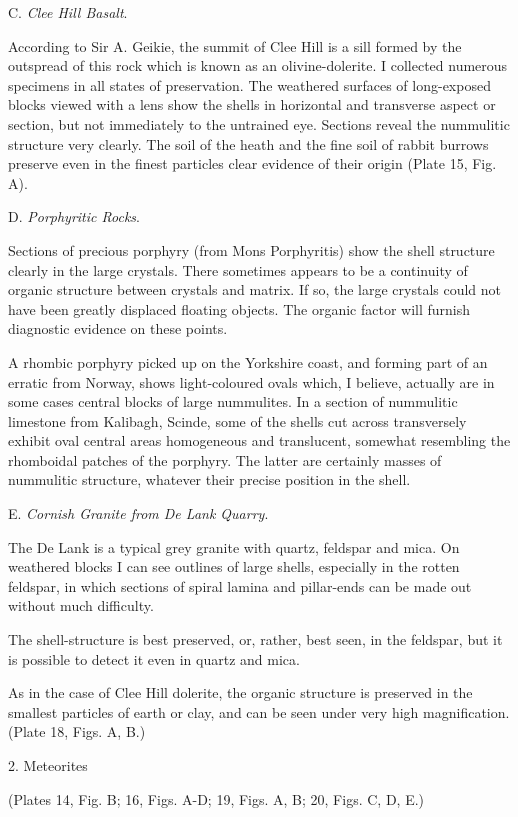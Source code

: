 \documentclass[a4paper, 12pt, oneside]{article}
\begin{document}
C. \emph{Clee Hill Basalt}.

According to Sir A. Geikie, the summit of Clee Hill is a sill formed by the outspread of this rock which is known as an olivine-dolerite. I collected numerous specimens in all states of preservation. The weathered surfaces of long-exposed blocks viewed with a lens show the shells in horizontal and transverse aspect or section, but not immediately to the untrained eye. Sections reveal the nummulitic structure very clearly. The soil of the heath and the fine soil of rabbit burrows preserve even in the finest particles clear evidence of their origin (Plate 15, Fig. A).

D. \emph{Porphyritic Rocks}.

Sections of precious porphyry (from Mons Porphyritis) show the shell structure clearly in the large crystals. There sometimes appears to be a continuity of organic structure between crystals and matrix. If so, the large crystals could not have been greatly displaced floating objects. The organic factor will furnish diagnostic evidence on these points.

A rhombic porphyry picked up on the Yorkshire coast, and forming part of an erratic from Norway, shows light-coloured ovals which, I believe, actually are in some cases central blocks of large nummulites. In a section of nummulitic limestone from Kalibagh, Scinde, some of the shells cut across transversely exhibit oval central areas homogeneous and translucent, somewhat resembling the rhomboidal patches of the porphyry. The latter are certainly masses of nummulitic structure, whatever their precise position in the shell.

E. \emph{Cornish Granite from De Lank Quarry}.

The De Lank is a typical grey granite with quartz, feldspar and mica. On weathered blocks I can see outlines of large shells, especially in the rotten feldspar, in which sections of spiral lamina and pillar-ends can be made out without much difficulty.

The shell-structure is best preserved, or, rather, best seen, in the feldspar, but it is possible to detect it even in quartz and mica.

As in the case of Clee Hill dolerite, the organic structure is preserved in the smallest particles of earth or clay, and can be seen under very high magnification. (Plate 18, Figs. A, B.)

2. Meteorites

(Plates 14, Fig. B; 16, Figs. A-D; 19, Figs. A, B; 20, Figs. C, D, E.)
\end{document}
